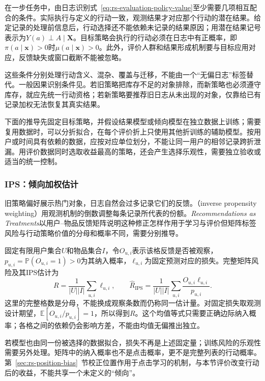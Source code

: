 在一步任务中，由日志识别式~\eqref{eq:rs-evaluation-policy-value}至少需要几项相互配合的条件。实际执行与定义的行动一致，观测结果才对应那个行动的潜在结果。给定记录的处理前信息后，行动选择还不能依赖未记录的结果原因；用潜在结果记号表示为$Y(a)\perp A\mid\bm X$。目标策略会执行的行动必须在日志中有正概率，即$\pi(a\mid\bm x)>0$时$\mu(a\mid\bm x)>0$。此外，评价人群和结果形成机制要与目标应用对应，反馈缺失或窗口截断不能被忽略。

这些条件分别处理行动含义、混杂、覆盖与迁移，不能由一个“无偏日志”标签替代。一般因果识别条件见。若旧策略把库存不足的对象排除，而新策略也必须遵守库存，就应先统一行动资格；若新策略要推荐旧日志从未出现的对象，仅靠给已有记录加权无法恢复其真实结果。

下面的推导先固定目标策略，并假设结果模型或倾向模型在独立数据上训练；需要复用数据时，可以分折拟合，在每个评价折上只使用其他折训练的辅助模型。按用户或时间具有依赖的数据，应按对应单位划分，不能让同一用户的相邻记录跨折泄漏。用评价数据同时选取收益最高的策略，还会产生选择乐观性，需要独立验收或适当的统一控制。

\Needspace{90mm}
\subsubsection{IPS：倾向加权估计}
\label{sec:rs-evaluation-ips}

旧策略偏好展示热门对象，日志自然会过多记录它们的反馈。（inverse propensity weighting）用观测机制的倒数调整每条记录所代表的份额。\emph{Recommendations as Treatments}以用户--物品反馈矩阵说明这种修正怎样作用于学习与评价但矩阵标签风险与行动策略价值的分母和概率不同，需要分别推导。

固定有限用户集合$U$和物品集合$I$，令$O_{u,i}$表示该格反馈是否被观察，$p_{u,i}=\mathbb P(O_{u,i}=1)>0$为其纳入概率，$\ell_{u,i}$为固定预测对应的损失。完整矩阵风险及其IPS估计为
\begin{equation}
  R=\frac{1}{|U||I|}\sum_{u,i}\ell_{u,i},
  \qquad
  \widehat R_{\mathrm{IPS}}
   =\frac{1}{|U||I|}
      \sum_{u,i}\frac{O_{u,i}\ell_{u,i}}{p_{u,i}}.
  \label{eq:rs-evaluation-matrix-ips}
\end{equation}
这里的完整格数是分母，不能换成观察条数而仍称同一估计量。对固定损失取观测设计期望，$\mathbb E[O_{u,i}/p_{u,i}]=1$，所以得到$R$。这个均值等式只需要正确边际纳入概率；各格之间的依赖仍会影响方差，不能由均值无偏推出独立。

若模型也由同一份被选择的数据拟合，损失不再是上述固定量；训练风险的乐观性需要另外处理。矩阵中的纳入概率也不是点击概率，更不是完整列表的行动概率。第~\ref{sec:rs-position-bias}~节校正位置作用于点击学习的机制，与本节评价改变行动后的收益，不能共享一个未定义的“倾向”。

